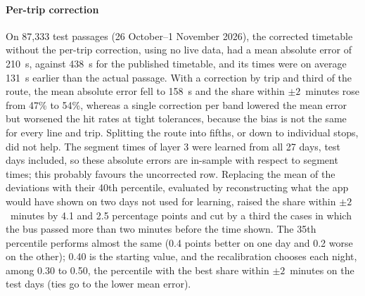 \paragraph{Per-trip correction} On 87,333 test passages (26 October--1 November 2026), the corrected timetable without
the per-trip correction, using no live data, had a mean absolute error of 210~s, against 438~s for the published
timetable, and its times were on average 131~s earlier than the actual passage. With a correction by trip and third of
the route, the mean absolute error fell to 158~s and the share within $\pm2$~minutes rose from 47\% to 54\%, whereas a
single correction per band lowered the mean error but worsened the hit rates at tight tolerances, because the bias is
not the same for every line and trip. Splitting the route into fifths, or down to individual stops, did not help.
The segment times of layer 3 were learned from all 27 days, test days included, so these absolute errors are
in-sample with respect to segment times; this probably favours the uncorrected row.
Replacing the mean of the deviations with their 40th percentile, evaluated by reconstructing what the app would have
shown on two days not used for learning, raised the share within $\pm2$~minutes by 4.1 and 2.5 percentage points and
cut by a third the cases in which the bus passed more than two minutes before the time shown. The 35th percentile
performs almost the same (0.4 points better on one day and 0.2 worse on the other); 0.40 is the starting value, and
the recalibration chooses each night, among 0.30 to 0.50, the percentile with the best share within $\pm2$~minutes on
the test days (ties go to the lower mean error).

